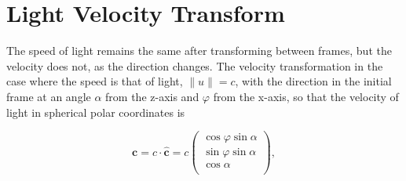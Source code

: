 

\section{Light Velocity Transform} \label{sect: Light Velocity Transform}

The speed of light remains the same after transforming between frames, but the velocity does not, as the direction changes.
The velocity transformation in the case where the speed is that of light, $\|u\| = {c}$, with the direction in the initial frame at an angle $\alpha$ from the z-axis and $\varphi$ from the x-axis, so that the velocity of light in spherical polar coordinates is

\begin{equation}
	\mathbf{c} = {c} \cdot {\mathbf{\hat{c}}}= {c}
	\begin{pmatrix}
		\cos{\varphi}\sin{\alpha} \\
		\sin{\varphi}\sin{\alpha} \\
		\cos{\alpha}              \\
	\end{pmatrix},
\end{equation}

